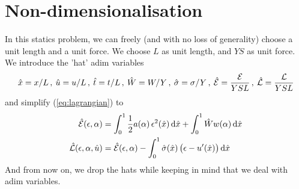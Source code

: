 \documentclass[]{article}
\renewcommand*\d{\mathop{}\!\mathrm{d}} %
\begin{document}
%
%
%
%
%
%
%
\section{Non-dimensionalisation} \label{sec:going_admin}
%
%
%
%
%
%
%
In this statics problem, we can freely (and with no loss of generality) choose a unit length and a unit force. We choose $L$ as unit length, and $YS$ as unit force.
We introduce the 'hat' adim variables
\begin{align}
\hat{x}=x/L \, , \:
\hat{u}=u/L \, , \:
\hat{t}=t/L \, , \:
\hat{W}=W/Y \, , \:
\hat{\sigma}=\sigma/Y \, , \:
\hat{{\cal E}}=\frac{{\cal E}}{YSL}  \, , \:
\hat{{\cal L}}=\frac{{\cal L}}{YSL}
\end{align}
and simplify (\ref{eq:lagrangian}) to
\begin{subequations}
\label{eq:going_adim}
\begin{align}
\hat{{\cal E}}(\epsilon,\alpha)& = 
\int_0^1 \frac12  a(\alpha) \, \epsilon^2(\hat{x}) \d \hat{x}+ \int_0^1 \hat{W}  w(\alpha) \d \hat{x} \\
\hat{{\cal L}}(\epsilon,\alpha,\hat{u}) & = \hat{{\cal E}}(\epsilon,\alpha) -  
\int_0^1 \hat{\sigma}(\hat{x})  \,  \big( \epsilon-u'(\hat{x}) \big) \d \hat{x} 
\end{align}
\end{subequations}
And from now on, we drop the hats while keeping in mind that we deal with adim variables.

%
%
%
%
%
%
%
\end{document}
